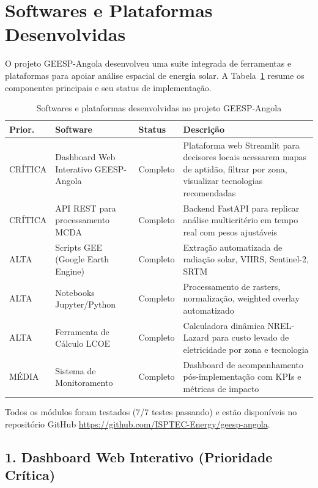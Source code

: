 \documentclass[12pt, a4paper]{article}
\begin{document}
\section{Softwares e Plataformas Desenvolvidas}

O projeto GEESP-Angola desenvolveu uma suite integrada de ferramentas e plataformas para apoiar análise espacial de energia solar. A Tabela~\ref{tab:softwares} resume os componentes principais e seu status de implementação.

\begin{table}[H]
\centering
\small
\caption{Softwares e plataformas desenvolvidas no projeto GEESP-Angola}
\label{tab:softwares}
\begin{tabular}{|l|l|l|p{5.5cm}|}
\hline
\textbf{Prior.} & \textbf{Software} & \textbf{Status} & \textbf{Descrição} \\
\hline
CRÍTICA & Dashboard Web Interativo GEESP-Angola & Completo & Plataforma web Streamlit para decisores locais acessarem mapas de aptidão, filtrar por zona, visualizar tecnologias recomendadas \\
\hline
CRÍTICA & API REST para processamento MCDA & Completo & Backend FastAPI para replicar análise multicritério em tempo real com pesos ajustáveis \\
\hline
ALTA & Scripts GEE (Google Earth Engine) & Completo & Extração automatizada de radiação solar, VIIRS, Sentinel-2, SRTM \\
\hline
ALTA & Notebooks Jupyter/Python & Completo & Processamento de rasters, normalização, weighted overlay automatizado \\
\hline
ALTA & Ferramenta de Cálculo LCOE & Completo & Calculadora dinâmica NREL-Lazard para custo levado de eletricidade por zona e tecnologia \\
\hline
MÉDIA & Sistema de Monitoramento & Completo & Dashboard de acompanhamento pós-implementação com KPIs e métricas de impacto \\
\hline
\end{tabular}
\end{table}

Todos os módulos foram testados (7/7 testes passando) e estão disponíveis no repositório GitHub \url{https://github.com/ISPTEC-Energy/geesp-angola}.

\subsection{1. Dashboard Web Interativo (Prioridade Crítica)}
\end{document}
